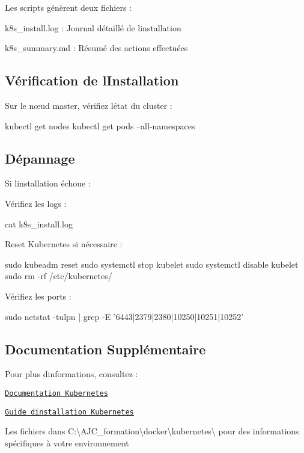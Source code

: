 Les scripts génèrent deux fichiers \+:
\begin{DoxyItemize}
\item {\ttfamily k8s\+\_\+install.\+log} \+: Journal détaillé de l\textquotesingle{}installation
\item {\ttfamily k8s\+\_\+summary.\+md} \+: Résumé des actions effectuées
\end{DoxyItemize}

\subsection*{Vérification de l\textquotesingle{}Installation}

Sur le nœud master, vérifiez l\textquotesingle{}état du cluster \+: 
\begin{DoxyCode}
kubectl get nodes
kubectl get pods --all-namespaces
\end{DoxyCode}


\subsection*{Dépannage}

Si l\textquotesingle{}installation échoue \+:


\begin{DoxyEnumerate}
\item Vérifiez les logs \+: 
\begin{DoxyCode}
cat k8s\_install.log
\end{DoxyCode}

\item Reset Kubernetes si nécessaire \+: 
\begin{DoxyCode}
sudo kubeadm reset
sudo systemctl stop kubelet
sudo systemctl disable kubelet
sudo rm -rf /etc/kubernetes/
\end{DoxyCode}

\item Vérifiez les ports \+: 
\begin{DoxyCode}
sudo netstat -tulpn | grep -E '6443|2379|2380|10250|10251|10252'
\end{DoxyCode}

\end{DoxyEnumerate}

\subsection*{Documentation Supplémentaire}

Pour plus d\textquotesingle{}informations, consultez \+:
\begin{DoxyItemize}
\item \href{https://kubernetes.io/docs/home/}{\tt Documentation Kubernetes}
\item \href{https://kubernetes.io/docs/setup/}{\tt Guide d\textquotesingle{}installation Kubernetes}
\item Les fichiers dans {\ttfamily C\+:\textbackslash{}A\+J\+C\+\_\+formation\textbackslash{}docker\textbackslash{}kubernetes\textbackslash{}} pour des informations spécifiques à votre environnement
\end{DoxyItemize}

